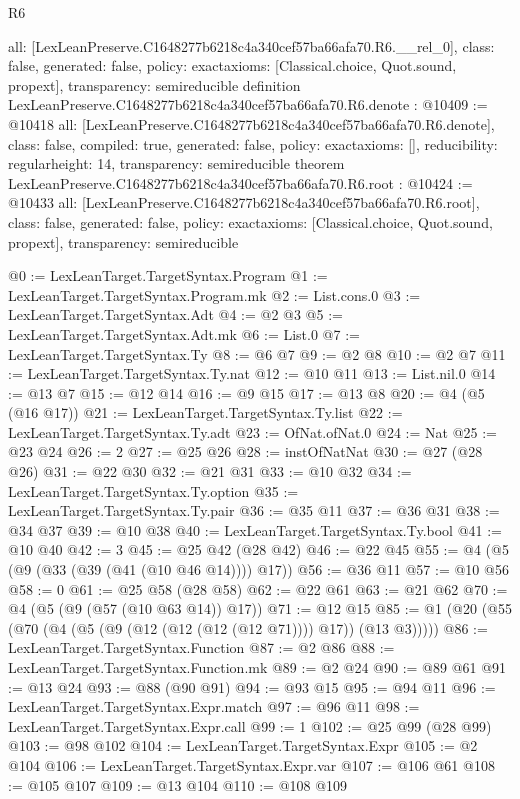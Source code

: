 \begin{lexlean}{R6}
\begin{coremodule}
{  all: [LexLeanPreserve.C1648277b6218c4a340cef57ba66afa70.R6.__rel_0],
  class: false,
  generated: false,
  policy: exact{axioms: [Classical.choice, Quot.sound, propext]},
  transparency: semireducible
}
definition LexLeanPreserve.C1648277b6218c4a340cef57ba66afa70.R6.denote : @10409 := @10418 {
  all: [LexLeanPreserve.C1648277b6218c4a340cef57ba66afa70.R6.denote],
  class: false,
  compiled: true,
  generated: false,
  policy: exact{axioms: []},
  reducibility: regular{height: 14},
  transparency: semireducible
}
theorem LexLeanPreserve.C1648277b6218c4a340cef57ba66afa70.R6.root : @10424 := @10433 {
  all: [LexLeanPreserve.C1648277b6218c4a340cef57ba66afa70.R6.root],
  class: false,
  generated: false,
  policy: exact{axioms: [Classical.choice, Quot.sound, propext]},
  transparency: semireducible
}

@0 := LexLeanTarget.TargetSyntax.Program
@1 := LexLeanTarget.TargetSyntax.Program.mk
@2 := List.cons.{0}
@3 := LexLeanTarget.TargetSyntax.Adt
@4 := @2 @3
@5 := LexLeanTarget.TargetSyntax.Adt.mk
@6 := List.{0}
@7 := LexLeanTarget.TargetSyntax.Ty
@8 := @6 @7
@9 := @2 @8
@10 := @2 @7
@11 := LexLeanTarget.TargetSyntax.Ty.nat
@12 := @10 @11
@13 := List.nil.{0}
@14 := @13 @7
@15 := @12 @14
@16 := @9 @15
@17 := @13 @8
@20 := @4 (@5 (@16 @17))
@21 := LexLeanTarget.TargetSyntax.Ty.list
@22 := LexLeanTarget.TargetSyntax.Ty.adt
@23 := OfNat.ofNat.{0}
@24 := Nat
@25 := @23 @24
@26 := 2
@27 := @25 @26
@28 := instOfNatNat
@30 := @27 (@28 @26)
@31 := @22 @30
@32 := @21 @31
@33 := @10 @32
@34 := LexLeanTarget.TargetSyntax.Ty.option
@35 := LexLeanTarget.TargetSyntax.Ty.pair
@36 := @35 @11
@37 := @36 @31
@38 := @34 @37
@39 := @10 @38
@40 := LexLeanTarget.TargetSyntax.Ty.bool
@41 := @10 @40
@42 := 3
@45 := @25 @42 (@28 @42)
@46 := @22 @45
@55 := @4 (@5 (@9 (@33 (@39 (@41 (@10 @46 @14)))) @17))
@56 := @36 @11
@57 := @10 @56
@58 := 0
@61 := @25 @58 (@28 @58)
@62 := @22 @61
@63 := @21 @62
@70 := @4 (@5 (@9 (@57 (@10 @63 @14)) @17))
@71 := @12 @15
@85 := @1 (@20 (@55 (@70 (@4 (@5 (@9 (@12 (@12 (@12 (@12 @71)))) @17)) (@13 @3)))))
@86 := LexLeanTarget.TargetSyntax.Function
@87 := @2 @86
@88 := LexLeanTarget.TargetSyntax.Function.mk
@89 := @2 @24
@90 := @89 @61
@91 := @13 @24
@93 := @88 (@90 @91)
@94 := @93 @15
@95 := @94 @11
@96 := LexLeanTarget.TargetSyntax.Expr.match
@97 := @96 @11
@98 := LexLeanTarget.TargetSyntax.Expr.call
@99 := 1
@102 := @25 @99 (@28 @99)
@103 := @98 @102
@104 := LexLeanTarget.TargetSyntax.Expr
@105 := @2 @104
@106 := LexLeanTarget.TargetSyntax.Expr.var
@107 := @106 @61
@108 := @105 @107
@109 := @13 @104
@110 := @108 @109

\end{coremodule}
\end{lexlean}
